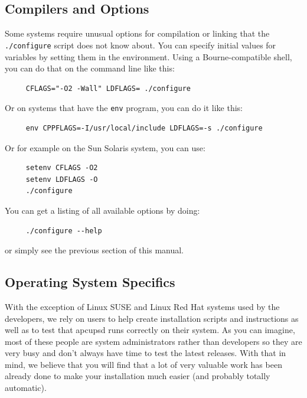 \label{Compilers-and-Options}

\subsection*{Compilers and Options}

\label{index-compiler-options-30}
Some systems require unusual options for compilation or linking that the {\tt
./configure} script does not know about. You can specify initial values for
variables by setting them in the environment. Using a Bourne-compatible shell,
you can do that on the command line like this: 

\footnotesize
\begin{verbatim}
     CFLAGS="-O2 -Wall" LDFLAGS= ./configure
\end{verbatim}
\normalsize

Or on systems that have the {\tt env} program, you can do it like this: 

\footnotesize
\begin{verbatim}
     env CPPFLAGS=-I/usr/local/include LDFLAGS=-s ./configure
\end{verbatim}
\normalsize

Or for example on the Sun Solaris system, you can use: 

\footnotesize
\begin{verbatim}
     setenv CFLAGS -O2
     setenv LDFLAGS -O
     ./configure
\end{verbatim}
\normalsize

You can get a listing of all available options by doing: 

\footnotesize
\begin{verbatim}
     ./configure --help
\end{verbatim}
\normalsize

or simply see the previous section of this manual. 

\label{Operating-System-Specifics}

\subsection*{Operating System Specifics}

\label{index-OSes-31}
With the exception of Linux SUSE and Linux Red Hat systems used by the
developers, we rely on users to help create installation scripts and
instructions as well as to test that apcupsd runs correctly on their system.
As you can imagine, most of these people are system administrators rather than
developers so they are very busy and don't always have time to test the latest
releases.  With that in mind, we believe that you will find that a lot of very
valuable work has been already done to make your installation much easier (and
probably totally automatic).  

